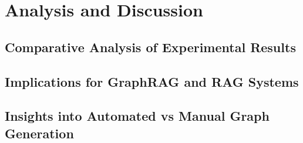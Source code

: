 \section{Analysis and Discussion}
\subsection{Comparative Analysis of Experimental Results}
\subsection{Implications for GraphRAG and RAG Systems}
\subsection{Insights into Automated vs Manual Graph Generation}
